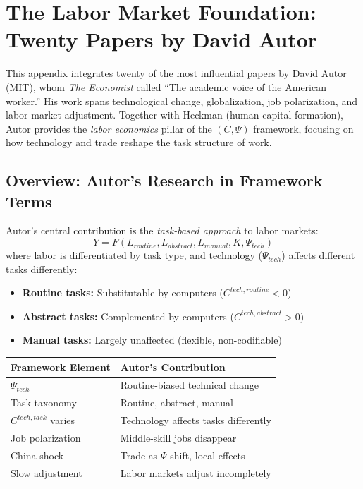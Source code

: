 \section{The Labor Market Foundation: Twenty Papers by David Autor}
\label{app:autor}

This appendix integrates twenty of the most influential papers by David Autor
(MIT), whom \emph{The Economist} called ``The academic voice of the American worker.''
His work spans technological change, globalization, job polarization, and
labor market adjustment. Together with Heckman (human capital formation),
Autor provides the \emph{labor economics} pillar of the $(C, \Psi)$ framework,
focusing on how technology and trade reshape the task structure of work.

\subsection{Overview: Autor's Research in Framework Terms}

Autor's central contribution is the \emph{task-based approach} to labor markets:
\begin{equation}
  Y = F(L_{routine}, L_{abstract}, L_{manual}, K, \Psi_{tech})
\end{equation}
where labor is differentiated by task type, and technology ($\Psi_{tech}$)
affects different tasks differently:
\begin{itemize}
  \item \textbf{Routine tasks:} Substitutable by computers ($C^{tech,routine} < 0$)
  \item \textbf{Abstract tasks:} Complemented by computers ($C^{tech,abstract} > 0$)
  \item \textbf{Manual tasks:} Largely unaffected (flexible, non-codifiable)
\end{itemize}

\begin{center}
\renewcommand{\arraystretch}{1.2}
\small
\begin{tabular}{ll}
\hline
\textbf{Framework Element} & \textbf{Autor's Contribution} \\
\hline
$\Psi_{tech}$ & Routine-biased technical change \\
Task taxonomy & Routine, abstract, manual \\
$C^{tech,task}$ varies & Technology affects tasks differently \\
Job polarization & Middle-skill jobs disappear \\
China shock & Trade as $\Psi$ shift, local effects \\
Slow adjustment & Labor markets adjust incompletely \\
\hline
\end{tabular}
\end{center}

